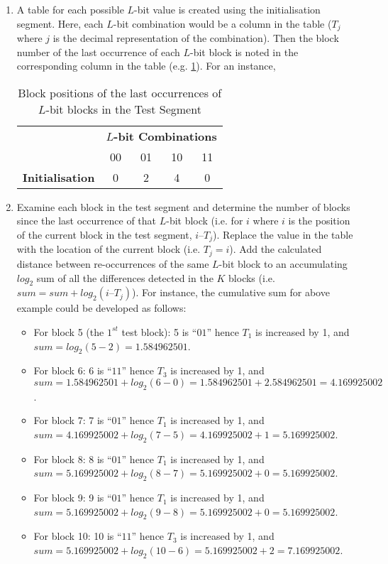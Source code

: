 \begin{enumerate}
    \item A table for each possible $L$-bit value is created using the initialisation segment. Here, each $L$-bit combination would be a column in the table ($T_j$ where $j$ is the decimal representation of the combination). Then the block number of the last occurrence of each $L$-bit block is noted in the corresponding column in the table (e.g. \ref{tab:ust_block_pos}). For an instance,
    
    \begin{table}[h!]
        \centering
        \begin{tabular}{|c|c|c|c|c|}
            \hline
            \multirow{2}{*}{} & \multicolumn{4}{c|}{\textbf{$L$-bit Combinations}} \\ \cline{2-5} 
             & 00 & 01 & 10 & 11 \\ \hline
            \textbf{Initialisation} & 0 & 2 & 4 & 0 \\ \hline
        \end{tabular}
        \caption{Block positions of the last occurrences of $L$-bit blocks in the Test Segment}
        \label{tab:ust_block_pos}
    \end{table}
    
    \item Examine each block in the test segment and determine the number of blocks since the last occurrence of that $L$-bit block (i.e. for $i$ where $i$ is the position of the current block in the test segment, $i–T_j$). Replace the value in the table with the location of the current block (i.e. $T_j=i$). Add the calculated distance between re-occurrences of the same $L$-bit block to an accumulating $log_2$ sum of all the differences detected in the $K$ blocks (i.e. $sum=sum+log_2(i–T_j)$). For instance, the cumulative sum for above example could be developed as follows:
    
    \begin{itemize}
        \item For block 5 (the $1^{st}$ test block): 5 is “$01$” hence $T_1$ is increased by 1, and $sum=log_2(5-2) = 1.584962501$.
        \item For block 6: 6 is “$11$” hence $T_3$ is increased by 1, and $sum=1.584962501+log_2(6-0)=1.584962501+2.584962501=4.169925002$.
        \item For block 7: 7 is “$01$” hence $T_1$ is increased by 1, and $sum=4.169925002+log_2(7-5)=4.169925002+1=5.169925002$.
        \item For block 8: 8 is “$01$” hence $T_1$ is increased by 1, and $sum=5.169925002+log_2(8-7)=5.169925002+0=5.169925002$.
        \item For block 9: 9 is “$01$” hence $T_1$ is increased by 1, and $sum=5.169925002+log_2(9-8)=5.169925002+0=5.169925002$.
        \item For block 10: 10 is “$11$” hence $T_3$ is increased by 1, and $sum=5.169925002+log_2(10-6)=5.169925002+2=7.169925002$. 
    \end{itemize}
    

\end{enumerate}
